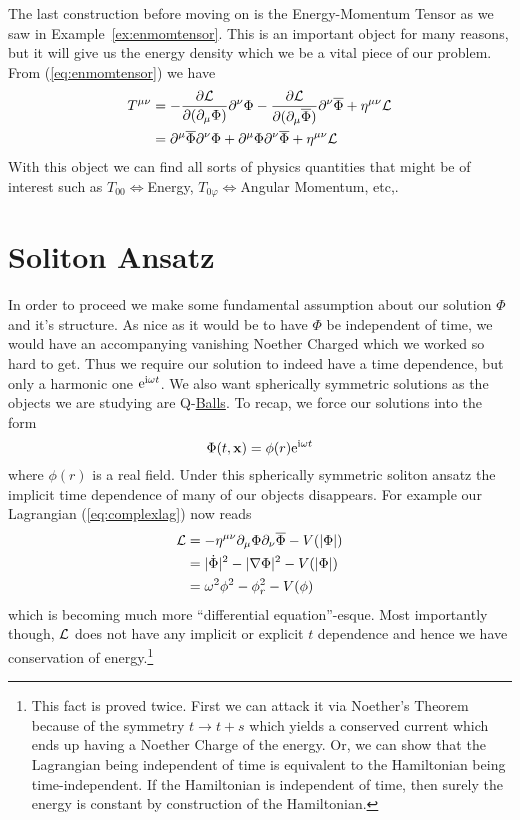 The last construction before moving on is the Energy-Momentum Tensor as we saw
in Example~\ref{ex:enmomtensor}. This is an important object for many reasons,
but it will give us the energy density which we be a vital piece of our problem.
From (\ref{eq:enmomtensor}) we have
\begin{align}
    T^{\mu\nu} & = -\pdv{\mathcal{L}}{(\partial_\mu\Phi)}\partial^\nu\Phi - \pdv{\mathcal{L}}{(\partial_\mu\overline{\Phi})}\partial^\nu\overline{\Phi} + \eta^{\mu\nu}\mathcal{L} \\
               & = \partial^\mu\overline{\Phi}\partial^\nu\Phi + \partial^\mu\Phi\partial^\nu\overline{\Phi} + \eta^{\mu\nu}\mathcal{L} \label{eq:enmomlowered}
\end{align}
With this object we can find all sorts of physics quantities that might be of
interest such as \(T_{00}\!\iff\)Energy, \(T_{0\varphi}\!\iff\)Angular
Momentum, etc,.

\section{Soliton Ansatz}\label{sec:solitonans}
In order to proceed we make some fundamental assumption about our solution
\(\Phi\) and it's structure. As nice as it would be to have \(\Phi\) be
independent of time, we would have an accompanying vanishing Noether Charged
which we worked so hard to get. Thus we require our solution to indeed have a
time dependence, but only a harmonic one \(\mathrm{e}^{\mathrm{i}\omega t}\). We also want
spherically symmetric solutions as the objects we are studying are
Q-\underline{Balls}. To recap, we force our solutions into the form
\begin{equation}\label{eq:solitonansatz}
    \Phi(t, \mathbf{x}) = \phi(r)\mathrm{e}^{\mathrm{i}\omega t}
\end{equation}
where \(\phi(r)\) is a real field. Under this spherically symmetric soliton
ansatz the implicit time dependence of many of our objects disappears. For
example our Lagrangian (\ref{eq:complexlag}) now reads
\begin{align}
    \mathcal{L} & = -\eta^{\mu\nu}\partial_\mu\Phi\partial_\nu\overline{\Phi} - V(|\Phi|) \\
         & = |\dot{\Phi}|^2 - |\nabla\Phi|^2 - V(|\Phi|)                           \\
         & = \omega^2\phi^2 - \phi_r^2 - V(\phi)
\end{align}
which is becoming much more ``differential equation''-esque. Most importantly
though, \(\mathcal{L}\) does not have any implicit or explicit \(t\) dependence and
hence we have conservation of energy.\footnote{This fact is proved twice. First
    we can attack it via Noether's Theorem because of the symmetry \(t\to t + s\)
    which yields a conserved current which ends up having a Noether Charge of the
    energy. Or, we can show that the Lagrangian being independent of time is
    equivalent to the Hamiltonian being time-independent. If the Hamiltonian is
    independent of time, then surely the energy is constant by construction of the
    Hamiltonian.}

